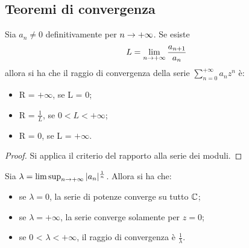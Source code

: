 \documentclass[Completo.tex]{subfiles}
\begin{document}
\subsection{Teoremi di convergenza}
\begin{Th}[d'Alembert]
	Sia $a_n \neq 0$ definitivamente per $n \rightarrow +\infty$. Se esiste
	\begin{equation*}
	L = \lim\limits_{n \rightarrow +\infty} \frac{a_{n+1}}{a_n}
	\end{equation*}
	allora si ha che il raggio di convergenza della serie $\sum\limits_{n=0}^{+\infty} a_n z^n$ è:
	\begin{itemize}
		\item R = $+\infty$, se L = 0;
		\item R = $\frac{1}{L}$, se $0 < L < +\infty$;
		\item R = 0, se L = $+\infty$.
	\end{itemize}
\end{Th}
\begin{proof}
	Si applica il criterio del rapporto alla serie dei moduli.
\end{proof}
\begin{eTh}
	Sia $\lambda = \limsup_{n \rightarrow +\infty} \vert a_n \vert^{\frac{1}{n}}$. Allora si ha che:
	\begin{itemize}
		\item se $\lambda = 0$, la serie di potenze converge su tutto $\bb[C]$;
		\item se $\lambda = +\infty$, la serie converge solamente per $z = 0$;
		\item se 0 < $\lambda < +\infty$, il raggio di convergenza è $\frac{1}{\lambda}$.
		\end{itemize}
\end{eTh}
\end{document}
